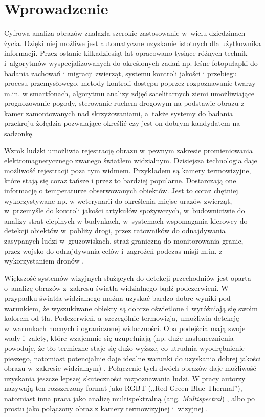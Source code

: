 \chapter{Wprowadzenie}

Cyfrowa analiza obrazów znalazła szerokie zastosowanie w~wielu dziedzinach życia.
Dzięki niej możliwe jest automatyczne uzyskanie istotnych dla użytkownika informacji.
Przez ostanie kilkadziesiąt lat opracowano tysiące różnych technik i~algorytmów wyspecjalizowanych do określonych zadań np. leśne fotopułapki do badania zachowań i migracji zwierząt, systemu kontroli jakości i przebiegu procesu przemysłowego, metody kontroli dostępu poprzez rozpoznawanie twarzy m.in. w smartfonach, algorytmu analizy zdjęć satelitarnych ziemi umożliwiające prognozowanie pogody, sterowanie ruchem drogowym na podstawie obrazu z kamer zamontowanych nad skrzyżowaniami, a~także systemy do badania przekroju żołędzia pozwalające określić czy jest on dobrym kandydatem na sadzonkę.

Wzrok ludzki umożliwia rejestrację obrazu w~pewnym zakresie promieniowania elektromagnetycznego zwanego światłem widzialnym.
Dzisiejsza technologia daje możliwość rejestracji poza tym widmem.
Przykładem są kamery termowizyjne, które stają się coraz tańsze i przez to bardziej popularne.
Dostarczają one informację o temperaturze obserwowanych obiektów.
Jest to coraz chętniej wykorzystywane np. w weterynarii do określenia miejsc urazów zwierząt, w~przemyśle do kontroli jakości artykułów spożywczych, w~budownictwie do analizy strat cieplnych w budynkach, w~systemach wspomagania kierowcy do detekcji obiektów w~pobliży drogi, przez ratowników do odnajdywania zasypanych ludzi w~gruzowiskach, straż graniczną do monitorowania granic, przez wojsko do odnajdywania celów i~zagrożeń podczas misji m.in. z wykorzystaniem dronów \cite{gade2014thermal}.

Większość systemów wizyjnych służących do detekcji przechodniów jest oparta o~analizę obrazów z~zakresu światła widzialnego bądź podczerwieni.
W przypadku światła widzialnego można uzyskać bardzo dobre wyniki pod warunkiem, że wyszukiwane obiekty są dobrze oświetlone i~wyróżniają się swoim kolorem od tła.
Podczerwień, a~szczególnie termowizja, umożliwia detekcję w~warunkach nocnych i ograniczonej widoczności.
Oba podejścia mają swoje wady i~zalety, które wzajemnie się uzupełniają (np. duże nasłonecznienia powoduje, że tło termiczne staje się dużo wyższe, co utrudnia wyodrębnienie pieszego, natomiast potencjalnie daje idealne warunki do uzyskania dobrej jakości obrazu w~zakresie widzialnym) \cite{lee2015robust}.
Połączenie tych dwóch obrazów daje możliwość uzyskania jeszcze lepszej skuteczności rozpoznawania ludzi.
W pracy \cite{st2007combination} autorzy nazywają ten rozszerzony format jako RGBT (,,Red-Green-Blue-Thermal''), natomiast inna praca jako analizę multispektralną (ang. \textit{Multispectral}) \cite{hwang2015multispectral}, albo po prostu jako połączony obraz z kamery termowizyjnej i~wizyjnej \cite{lee2015robust}.

